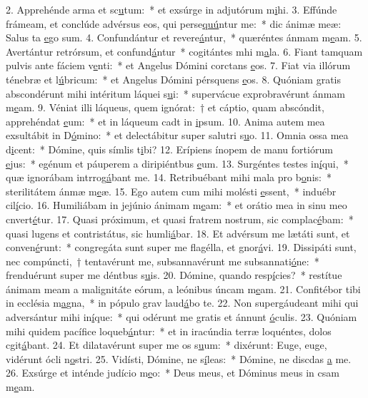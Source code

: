 2. Apprehénde arma et sc\uline{u}tum:~* et exsúrge in adjutórum m\uline{i}hi.
3. Effúnde frámeam, et conclúde advérsus eos, qui perse\uline{quú}ntur me:~* dic ánimæ meæ: Salus ta \uline{e}go sum.
4. Confundántur et revere\uline{á}ntur,~* quæréntes ánmam m\uline{e}am.
5. Avertántur retrórsum, et confund\uline{á}ntur~* cogitántes mhi m\uline{a}la.
6. Fiant tamquam pulvis ante fáciem v\uline{e}nti:~* et Angelus Dómini corctans \uline{e}os.
7. Fiat via illórum ténebræ et l\uline{ú}bricum:~* et Angelus Dómini pérsquens \uline{e}os.
8. Quóniam gratis abscondérunt mihi intéritum láquei s\uline{u}i:~* supervácue exprobravérunt ánmam m\uline{e}am.
9. Véniat illi láqueus, quem ignórat:~† et cáptio, quam abscóndit, apprehéndat \uline{e}um:~* et in láqueum cadt in \uline{i}psum.
10. Anima autem mea exsultábit in D\uline{ó}mino:~* et delectábitur super salutri s\uline{u}o.
11. Omnia ossa mea d\uline{i}cent:~* Dómine, quis símlis t\uline{i}bi?
12. Erípiens ínopem de manu fortiórum \uline{e}jus:~* egénum et páuperem a diripiéntbus \uline{e}um.
13. Surgéntes testes in\uline{í}qui,~* quæ ignorábam intrrog\uline{á}bant me.
14. Retribuébant mihi mala pro b\uline{o}nis:~* sterilitátem ánmæ m\uline{e}æ.
15. Ego autem cum mihi molésti \uline{e}ssent,~* induébr cil\uline{í}cio.
16. Humiliábam in jejúnio ánimam m\uline{e}am:~* et orátio mea in sinu meo cnvert\uline{é}tur.
17. Quasi próximum, et quasi fratrem nostrum, sic complac\uline{é}bam:~* quasi lugens et contristátus, sic humli\uline{á}bar.
18. Et advérsum me lætáti sunt, et conven\uline{é}runt:~* congregáta sunt super me flagélla, et gnor\uline{á}vi.
19. Dissipáti sunt, nec compúncti,~† tentavérunt me, subsannavérunt me subsannati\uline{ó}ne:~* frenduérunt super me déntbus s\uline{u}is.
20. Dómine, quando resp\uline{í}cies?~* restítue ánimam meam a malignitáte eórum, a leónibus úncam m\uline{e}am.
21. Confitébor tibi in ecclésia m\uline{a}gna,~* in pópulo grav laud\uline{á}bo te.
22. Non supergáudeant mihi qui adversántur mihi in\uline{í}que:~* qui odérunt me gratis et ánnunt \uline{ó}culis.
23. Quóniam mihi quidem pacífice loqueb\uline{á}ntur:~* et in iracúndia terræ loquéntes, dolos cgit\uline{á}bant.
24. Et dilatavérunt super me os s\uline{u}um:~* dixérunt: Euge, euge, vidérunt ócli n\uline{o}stri.
25. Vidísti, Dómine, ne s\uline{í}leas:~* Dómine, ne discdas \uline{a} me.
26. Exsúrge et inténde judício m\uline{e}o:~* Deus meus, et Dóminus meus in csam m\uline{e}am.
